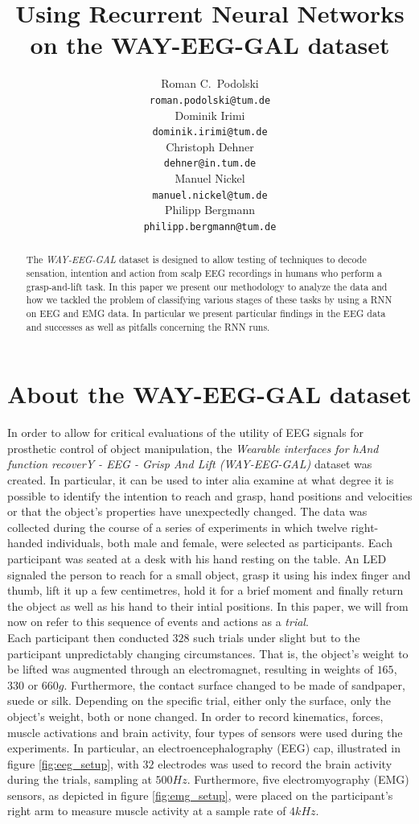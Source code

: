 \documentclass{article} %
\title{Using Recurrent Neural Networks on the WAY-EEG-GAL dataset}
\author{
Roman C.~Podolski
\\
\texttt{roman.podolski@tum.de} \\
\And
Dominik Irimi \\
\texttt{dominik.irimi@tum.de} \\
\AND
Christoph Dehner \\
\texttt{dehner@in.tum.de} \\
\And
Manuel Nickel \\
\texttt{manuel.nickel@tum.de} \\
\And
Philipp Bergmann \\
\texttt{philipp.bergmann@tum.de} \\
}
\begin{document}
\maketitle

\begin{abstract}
The \emph{WAY-EEG-GAL} dataset is designed to allow testing of techniques to decode sensation, intention and action from scalp EEG recordings in humans who perform a grasp-and-lift task. In this paper we present our methodology to analyze the data and how we tackled the problem of classifying various stages of these tasks by using a RNN on EEG and EMG data. In particular we present particular findings in the EEG data and successes as well as pitfalls concerning the RNN runs.
\end{abstract}

\section{About the WAY-EEG-GAL dataset}\label{sec:tsne}
In order to allow for critical evaluations of the utility of EEG signals for prosthetic control of object manipulation, the \emph{Wearable interfaces for hAnd function recoverY - EEG - Grisp And Lift (WAY-EEG-GAL)} dataset was created. In particular, it can be used to inter alia examine at what degree it is possible to identify the intention to reach and grasp, hand positions and velocities or that the object's properties have unexpectedly changed. The data was collected during the course of a series of experiments in which twelve right-handed individuals, both male and female, were selected as participants. Each participant was seated at a desk with his hand resting on the table. An LED signaled the person to reach for a small object, grasp it using his index finger and thumb, lift it up a few centimetres, hold it for a brief moment and finally return the object as well as his hand to their intial positions. In this paper, we will from now on refer to this sequence of events and actions as a \emph{trial}. \\
Each participant then conducted $328$ such trials under slight but to the participant unpredictably changing circumstances. That is, the object's weight to be lifted was augmented through an electromagnet, resulting in weights of $165$, $330$ or $660 g$. Furthermore, the contact surface changed to be made of sandpaper, suede or silk. Depending on the specific trial, either only the surface, only the object's weight, both or none changed. In order to record kinematics, forces, muscle activations and brain activity, four types of sensors were used during the experiments. In particular, an electroencephalography (EEG) cap, illustrated in figure \ref{fig:eeg_setup}, with $32$ electrodes was used to record the brain activity during the trials, sampling at $500 Hz$. Furthermore, five electromyography (EMG) sensors, as depicted in figure \ref{fig:emg_setup}, were placed on the participant's right arm to measure muscle activity at a sample rate of $4 kHz$.\\
\end{document}
